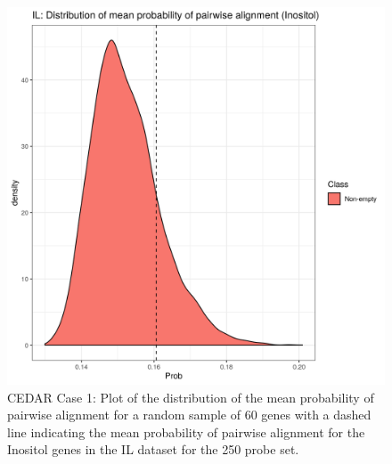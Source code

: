 \documentclass[12pt]{article} %
\begin{document}
	\begin{figure}[h]
		\centering
		\includegraphics[scale=0.75]{Images/Biology_data/Set_250/All_datasets/Mean_alignment_probability/IL_KEGG_INOSITOL_PHOSPHATE_METABOLISM.png}
		\caption{CEDAR Case 1: Plot of the distribution of the mean probability of pairwise alignment for a random sample of 60 genes with a dashed line indicating the mean probability of pairwise alignment for the Inositol genes in the IL dataset for the 250 probe set.}
		\label{fig:results:cedar_1:mdi_il_inostiol_alignemnt_prob_distn}
	\end{figure}
\end{document}
